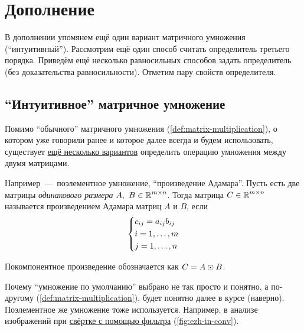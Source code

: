 \documentclass[a4paper,12pt]{article}
\begin{document}
  
  \newpage
  
  
  \section{Дополнение}
  
  В дополнении упомянем ещё один вариант матричного умножения (``интуитивный'').
  Рассмотрим ещё один способ считать определитель третьего порядка.
  Приведём ещё несколько равносильных способов задать определитель (без доказательства равносильности).
  Отметим пару свойств определителя.
  
  
  \subsection{``Интуитивное'' матричное умножение}
  
  Помимо ``обычного'' матричного умножения (\ref{def:matrix-multiplication}), о котором уже говорили ранее и которое далее всегда и будем использовать, существует \href{https://en.wikipedia.org/wiki/Hadamard\_product\_(matrices)\#The\_mixed-product\_property}{ещё несколько вариантов} определить операцию умножения между двумя матрицами.
  
  Например~---~поэлементное умножение, ``произведение Адамара''.
  Пусть есть две матрицы \emph{одинакового размера} $A,\ B \hm\in \RR^{m \times n}$.
  Тогда матрица $C \hm\in \RR^{m \times n}$ называется произведением Адамара матриц $A$ и $B$, если
  \[
    \left\{
      \begin{aligned}
        &c_{ij} \hm= a_{ij} b_{ij}\\
        &i \hm= 1, \ldots, m\\
        &j \hm= 1, \ldots, n
      \end{aligned}
    \right.
  \]
  
  Покомпонентное произведение обозначается как $C \hm= A \odot B$.
  
  Почему ``умножение по умолчанию'' выбрано не так просто и понятно, а по-другому (\ref{def:matrix-multiplication}), будет понятно далее в курсе (наверно).
  Поэлементное же умножение тоже используется.
  Например, в анализе изображений при \href{https://en.wikipedia.org/wiki/Kernel\_(image\_processing)}{свёртке с помощью фильтра} (\ref{fig:ezh-in-conv}).
  
\end{document}

